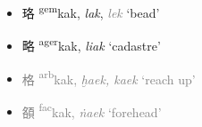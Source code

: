 \begin{itemize}
   




    \item {\Large{珞}} %
    {\large{{\textsuperscript{gem}}kak}},
    \textit{lak}, \textcolor{gray}{\textit{lek}} `bead' %

    \item {\Large{略}} %
    {\large{{\textsuperscript{ager}}kak}},
    \textit{liak} `cadastre' %


    \item \textcolor{gray}{{\Large{格}} %
    {\large{{\textsuperscript{arb}}kak}},
    \textit{ḫaek, kaek} `reach up' %
    }





    \item \textcolor{gray}{{\Large{頟}} %
    {\large{{\textsuperscript{fac}}kak}},
    \textit{ṅaek} `forehead'} %
   


\end{itemize}
